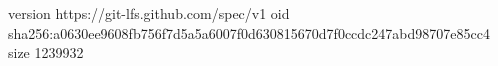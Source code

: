 version https://git-lfs.github.com/spec/v1
oid sha256:a0630ee9608fb756f7d5a5a6007f0d630815670d7f0ccdc247abd98707e85cc4
size 1239932
